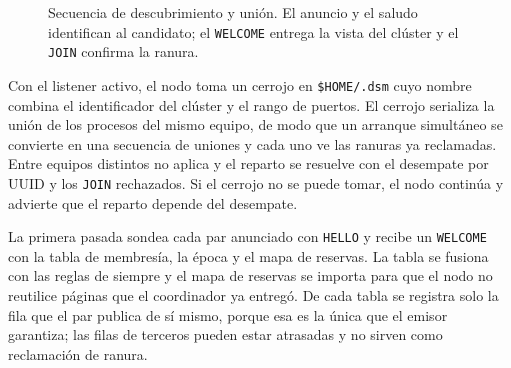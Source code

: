 \begin{figure}[H]
\centering
{}
\caption{Secuencia de descubrimiento y unión. El anuncio y el saludo identifican al candidato; el \texttt{WELCOME} entrega la vista del clúster y el \texttt{JOIN} confirma la ranura.}
\label{fig:descubrimiento-join}
\end{figure}

Con el listener activo, el nodo toma un cerrojo en \texttt{\$HOME/.dsm} cuyo nombre combina el identificador del clúster y el rango de puertos. El cerrojo serializa la unión de los procesos del mismo equipo, de modo que un arranque simultáneo se convierte en una secuencia de uniones y cada uno ve las ranuras ya reclamadas. Entre equipos distintos no aplica y el reparto se resuelve con el desempate por UUID y los \texttt{JOIN} rechazados. Si el cerrojo no se puede tomar, el nodo continúa y advierte que el reparto depende del desempate.

La primera pasada sondea cada par anunciado con \texttt{HELLO} y recibe un \texttt{WELCOME} con la tabla de membresía, la época y el mapa de reservas. La tabla se fusiona con las reglas de siempre y el mapa de reservas se importa para que el nodo no reutilice páginas que el coordinador ya entregó. De cada tabla se registra solo la fila que el par publica de sí mismo, porque esa es la única que el emisor garantiza; las filas de terceros pueden estar atrasadas y no sirven como reclamación de ranura.

